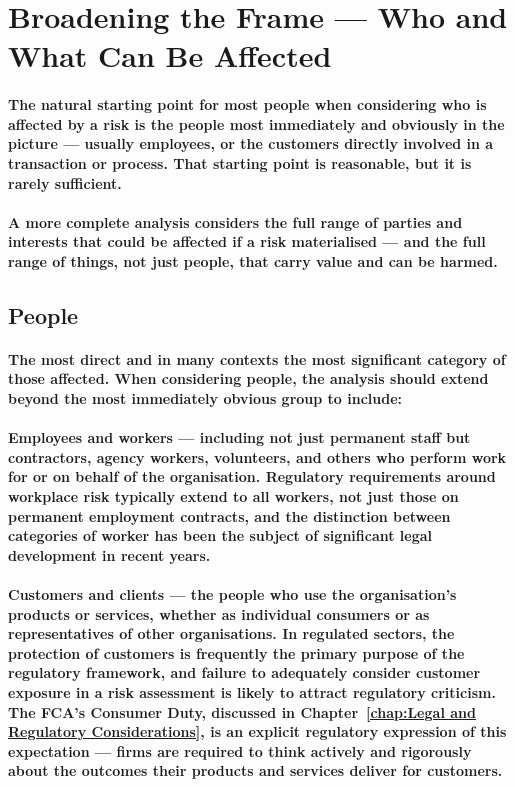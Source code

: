 \section{Broadening the Frame — Who and What Can Be Affected}
\paragraph{The natural starting point for most people when considering who is affected by a risk is the people most immediately and obviously in the picture — usually employees, or the customers directly involved in a transaction or process. That starting point is reasonable, but it is rarely sufficient.}
\paragraph{A more complete analysis considers the full range of parties and interests that could be affected if a risk materialised — and the full range of things, not just people, that carry value and can be harmed.}

\subsection{People}
\paragraph{The most direct and in many contexts the most significant category of those affected. When considering people, the analysis should extend beyond the most immediately obvious group to include:}
\paragraph{\textbf{Employees and workers} — including not just permanent staff but contractors, agency workers, volunteers, and others who perform work for or on behalf of the organisation. Regulatory requirements around workplace risk typically extend to all workers, not just those on permanent employment contracts, and the distinction between categories of worker has been the subject of significant legal development in recent years.}
\paragraph{\textbf{Customers and clients} — the people who use the organisation's products or services, whether as individual consumers or as representatives of other organisations. In regulated sectors, the protection of customers is frequently the primary purpose of the regulatory framework, and failure to adequately consider customer exposure in a risk assessment is likely to attract regulatory criticism. The FCA's Consumer Duty, discussed in Chapter~\ref{chap:Legal and Regulatory Considerations}, is an explicit regulatory expression of this expectation — firms are required to think actively and rigorously about the outcomes their products and services deliver for customers.}
